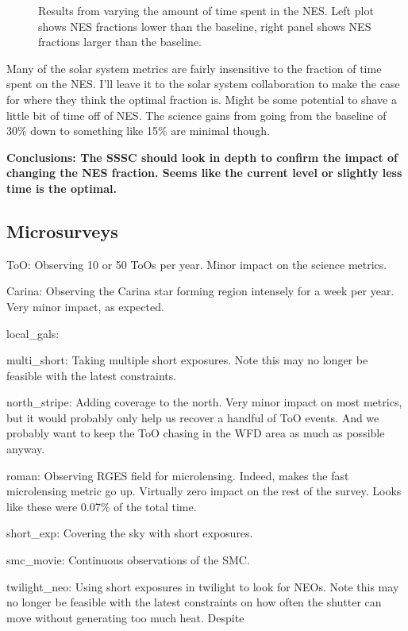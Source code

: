 \begin{figure}
\caption{Results from varying the amount of time spent in the NES. Left plot shows NES fractions lower than the baseline, right panel shows NES fractions larger than the baseline.\label{fig:vary_nes}}
\end{figure}


Many of the solar system metrics are fairly insensitive to the fraction of time spent on the NES. I'll leave it to the solar system collaboration to make the case for where they think the optimal fraction is. Might be some potential to shave a little bit of time off of NES. The science gains from going from the baseline of 30\% down to something like 15\% are minimal though.

{\bf Conclusions:  The SSSC should look in depth to confirm the impact of changing the NES fraction. Seems like the current level or slightly less time is the optimal.}


\subsection{Microsurveys}

ToO: Observing 10 or 50 ToOs per year. Minor impact on the science metrics.


Carina:  Observing the Carina star forming region intensely for a week per year.  Very minor impact, as expected.


local\_gals:  

multi\_short:  Taking multiple short exposures. Note this may no longer be feasible with the latest constraints.

north\_stripe:  Adding coverage to the north. Very minor impact on most metrics, but it would probably only help us recover a handful of ToO events. And we probably want to keep the ToO chasing in the WFD area as much as possible anyway.

roman: Observing RGES field for microlensing. Indeed, makes the fast microlensing metric go up. Virtually zero impact on the rest of the survey. Looks like these were 0.07\% of the total time. 

short\_exp: Covering the sky with short exposures. 

smc\_movie: Continuous observations of the SMC. 

twilight\_neo:  Using short exposures in twilight to look for NEOs. Note this may no longer be feasible with the latest constraints on how often the shutter can move without generating too much heat. Despite 

